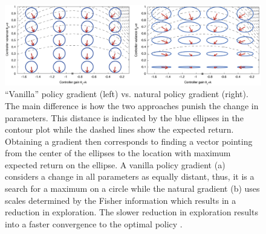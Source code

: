 \begin{figure}[!htb]
    \centering
    \includegraphics[width=1\linewidth]{Images/4_0_euclidean_vs_natural}
	\caption[``Vanilla'' policy gradient vs. natural policy gradient]{``Vanilla'' policy gradient (left) vs. natural policy gradient (right). The main difference is how the two approaches punish the change in parameters. This distance is 	indicated by the blue ellipses in the contour plot while the dashed lines show the expected return. Obtaining a gradient then corresponds to finding a vector pointing from the center of the ellipses to the location with maximum expected return on the ellipse. A vanilla policy gradient (a) considers a change in all parameters as equally distant, thus, it is a search for a maximum on a circle while the natural gradient (b) uses scales determined by the Fisher information which results in a reduction in exploration. The slower reduction in exploration results into a faster convergence to the optimal policy \cite{peters2008reinforcement}.}
\end{figure}

